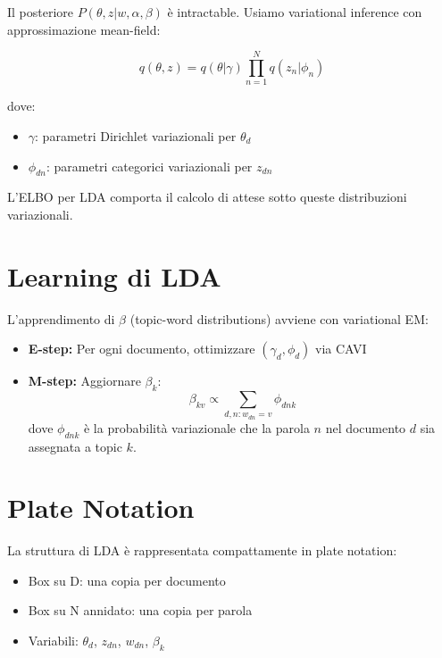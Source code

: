 Il posteriore $P(\theta, z | w, \alpha, \beta)$ è intractable. Usiamo variational inference con approssimazione mean-field:

\[q(\theta, z) = q(\theta | \gamma) \prod_{n=1}^N q(z_n | \phi_n)\]

dove:
\begin{itemize}
  \item $\gamma$: parametri Dirichlet variazionali per $\theta_d$
  \item $\phi_{dn}$: parametri categorici variazionali per $z_{dn}$
\end{itemize}

L'ELBO per LDA comporta il calcolo di attese sotto queste distribuzioni variazionali.

\section{Learning di LDA}

L'apprendimento di $\beta$ (topic-word distributions) avviene con variational EM:

\begin{itemize}
  \item \textbf{E-step:} Per ogni documento, ottimizzare $(\gamma_d, \phi_d)$ via CAVI
  \item \textbf{M-step:} Aggiornare $\beta_k$:
  \[\beta_{kv} \propto \sum_{d,n: w_{dn}=v} \phi_{dnk}\]
  dove $\phi_{dnk}$ è la probabilità variazionale che la parola $n$ nel documento $d$ sia assegnata a topic $k$.
\end{itemize}

\section{Plate Notation}

La struttura di LDA è rappresentata compattamente in plate notation:
\begin{itemize}
  \item Box su D: una copia per documento
  \item Box su N annidato: una copia per parola
  \item Variabili: $\theta_d$, $z_{dn}$, $w_{dn}$, $\beta_k$
\end{itemize}

